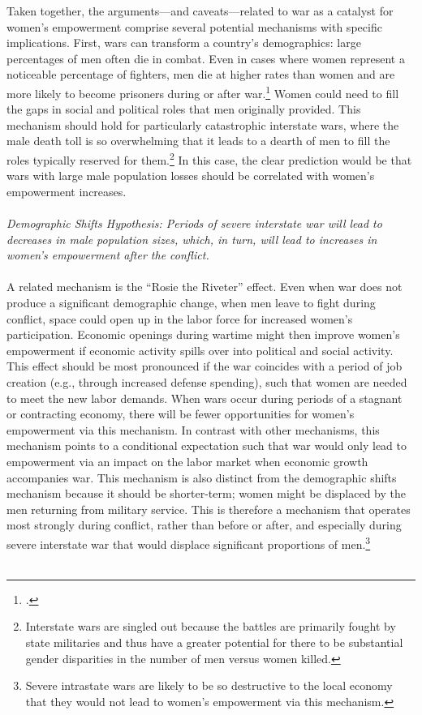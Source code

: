 \documentclass [12pt] {article}
\begin{document}
Taken together, the arguments---and caveats---related to war as a catalyst for women's empowerment comprise several potential mechanisms with specific implications. First, wars can transform a country's demographics: large percentages of men often die in combat. Even in cases where women represent a noticeable percentage of fighters, men die at higher rates than women and are more likely to become prisoners during or after war.\footnote{.} Women could need to fill the gaps in social and political roles that men originally provided. This mechanism should hold for particularly catastrophic interstate wars, where the male death toll is so overwhelming that it leads to a dearth of men to fill the roles typically reserved for them.\footnote{Interstate wars are singled out because the battles are primarily fought by state militaries and thus have a greater potential for there to be substantial gender disparities in the number of men versus women killed.} In this case, the clear prediction would be that wars with large male population losses should be correlated with women's empowerment increases. \\ \\

\emph{Demographic Shifts Hypothesis: Periods of severe interstate war will lead to decreases in male population sizes, which, in turn, will lead to increases in women's empowerment after the conflict. }\\ \\

A related mechanism is the ``Rosie the Riveter'' effect. Even when war does not produce a significant demographic change, when men leave to fight during conflict, space could open up in the labor force for increased women's participation. Economic openings during wartime might then improve women's empowerment if economic activity spills over into political and social activity.  This effect should be most pronounced if the war coincides with a period of job creation (e.g., through increased defense spending), such that women are needed to meet the new labor demands. When wars occur during periods of a stagnant or contracting economy, there will be fewer opportunities for women's empowerment via this mechanism. In contrast with other mechanisms, this mechanism points to a conditional expectation such that war would only lead to empowerment via an impact on the labor market when economic growth accompanies war. This mechanism is also distinct from the demographic shifts mechanism because it should be shorter-term; women might be displaced by the men returning from military service. This is therefore a mechanism that operates most strongly during conflict, rather than before or after, and especially during severe interstate war that would displace significant proportions of men.\footnote{Severe intrastate wars are likely to be so destructive to the local economy that they would not lead to women's empowerment via this mechanism.} \\  \\
\end{document}
